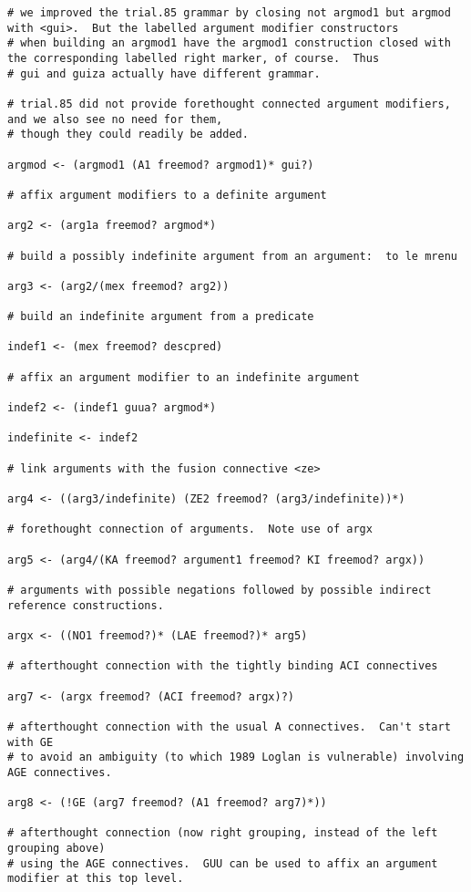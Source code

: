 \documentclass{article}
\begin{document}
\begin{verbatim}
# we improved the trial.85 grammar by closing not argmod1 but argmod with <gui>.  But the labelled argument modifier constructors
# when building an argmod1 have the argmod1 construction closed with the corresponding labelled right marker, of course.  Thus
# gui and guiza actually have different grammar.

# trial.85 did not provide forethought connected argument modifiers, and we also see no need for them,
# though they could readily be added.

argmod <- (argmod1 (A1 freemod? argmod1)* gui?)

# affix argument modifiers to a definite argument

arg2 <- (arg1a freemod? argmod*)

# build a possibly indefinite argument from an argument:  to le mrenu

arg3 <- (arg2/(mex freemod? arg2))

# build an indefinite argument from a predicate

indef1 <- (mex freemod? descpred)

# affix an argument modifier to an indefinite argument

indef2 <- (indef1 guua? argmod*)

indefinite <- indef2

# link arguments with the fusion connective <ze>

arg4 <- ((arg3/indefinite) (ZE2 freemod? (arg3/indefinite))*)

# forethought connection of arguments.  Note use of argx

arg5 <- (arg4/(KA freemod? argument1 freemod? KI freemod? argx))

# arguments with possible negations followed by possible indirect reference constructions.

argx <- ((NO1 freemod?)* (LAE freemod?)* arg5)

# afterthought connection with the tightly binding ACI connectives

arg7 <- (argx freemod? (ACI freemod? argx)?)

# afterthought connection with the usual A connectives.  Can't start with GE
# to avoid an ambiguity (to which 1989 Loglan is vulnerable) involving AGE connectives.

arg8 <- (!GE (arg7 freemod? (A1 freemod? arg7)*))

# afterthought connection (now right grouping, instead of the left grouping above)
# using the AGE connectives.  GUU can be used to affix an argument modifier at this top level.


\end{verbatim}
\end{document}
